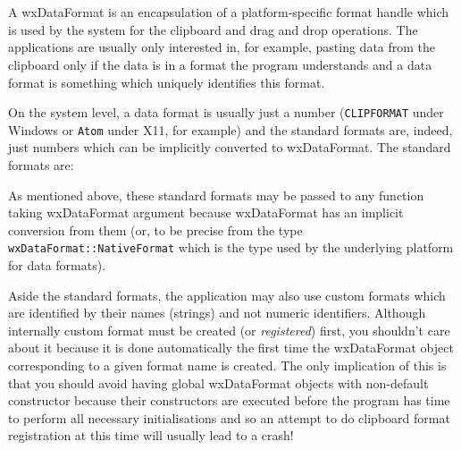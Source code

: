 
\section{}\label{wxdataformat}

A wxDataFormat is an encapsulation of a platform-specific format handle which
is used by the system for the clipboard and drag and drop operations. The
applications are usually only interested in, for example, pasting data from the
clipboard only if the data is in a format the program understands and a data
format is something which uniquely identifies this format.

On the system level, a data format is usually just a number ({\tt CLIPFORMAT}
under Windows or {\tt Atom} under X11, for example) and the standard formats
are, indeed, just numbers which can be implicitly converted to wxDataFormat.
The standard formats are:

\begin{twocollist}\itemsep=1cm
\end{twocollist}

As mentioned above, these standard formats may be passed to any function taking
wxDataFormat argument because wxDataFormat has an implicit conversion from
them (or, to be precise from the type {\tt wxDataFormat::NativeFormat} which is
the type used by the underlying platform for data formats).

Aside the standard formats, the application may also use custom formats which
are identified by their names (strings) and not numeric identifiers. Although
internally custom format must be created (or {\it registered}) first, you
shouldn't care about it because it is done automatically the first time the
wxDataFormat object corresponding to a given format name is created. The only
implication of this is that you should avoid having global wxDataFormat objects
with non-default constructor because their constructors are executed before the
program has time to perform all necessary initialisations and so an attempt to
do clipboard format registration at this time will usually lead to a crash!

